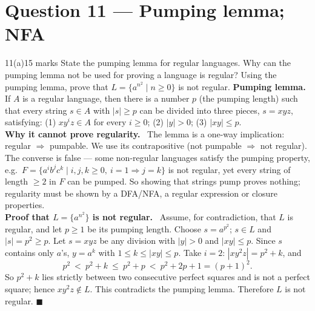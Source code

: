 \documentclass[10.5pt,a4paper]{article}
\newcommand{\ansh}[1]{\textbf{\color{exborder}#1}\ }
\begin{document}
\section{Question 11 --- Pumping lemma; NFA}
\begin{qa}{11(a)}{15 marks}
State the pumping lemma for regular languages. Why can the pumping lemma not be used for proving a language is regular? Using the pumping lemma,
prove that $L=\{a^{n^2}\mid n\ge0\}$ is not regular.
\tcblower
\ansh{Pumping lemma.} If $A$ is a regular language, then there is a number $p$ (the pumping length) such that every string $s\in A$ with
$|s|\ge p$ can be divided into three pieces, $s=xyz$, satisfying: (1) $xy^iz\in A$ for every $i\ge0$; (2) $|y|>0$; (3) $|xy|\le p$.\\
\ansh{Why it cannot prove regularity.} The lemma is a one-way implication: regular $\Rightarrow$ pumpable. We use its contrapositive
(not pumpable $\Rightarrow$ not regular). The converse is false --- some non-regular languages satisfy the pumping property, e.g.\
$F=\{a^ib^jc^k\mid i,j,k\ge0,\ i=1\Rightarrow j=k\}$ is not regular, yet every string of length $\ge2$ in $F$ can be pumped. So showing that strings
pump proves nothing; regularity must be shown by a DFA/NFA, a regular expression or closure properties.\\
\ansh{Proof that $L=\{a^{n^2}\}$ is not regular.} Assume, for contradiction, that $L$ is regular, and let $p\ge1$ be its pumping length.
Choose $s=a^{p^2}$; $s\in L$ and $|s|=p^2\ge p$. Let $s=xyz$ be any division with $|y|>0$ and $|xy|\le p$. Since $s$ contains only $a$'s,
$y=a^k$ with $1\le k\le|xy|\le p$. Take $i=2$: $|xy^2z|=p^2+k$, and
\[p^2\ <\ p^2+k\ \le\ p^2+p\ <\ p^2+2p+1=(p+1)^2 .\]
So $p^2+k$ lies strictly between two consecutive perfect squares and is not a perfect square; hence $xy^2z\notin L$. This contradicts the
pumping lemma. Therefore $L$ is not regular. $\blacksquare$
\end{qa}
\end{document}
